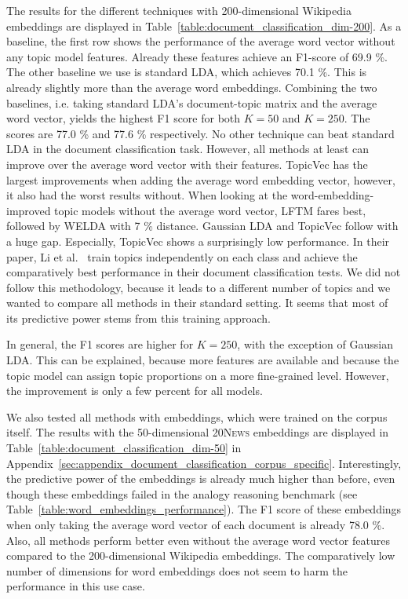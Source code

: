 \documentclass[
        a4paper,
        titlepage,
        twoside,
        parskip,
        numbers=noenddot
        ]{scrbook}
\theoremstyle{break}
\begin{document}
The results for the different techniques with 200-dimensional Wikipedia embeddings are displayed in Table~\ref{table:document_classification_dim-200}.
As a baseline, the first row shows the performance of the average word vector without any topic model features.
Already these features achieve an F1-score of 69.9 \%.
The other baseline we use is standard LDA, which achieves 70.1 \%.
This is already slightly more than the average word embeddings.
Combining the two baselines, i.e. taking standard LDA's document-topic matrix and the average word vector, yields the highest F1 score for both $K = 50$ and $K = 250$.
The scores are 77.0 \% and 77.6 \% respectively.
No other technique can beat standard LDA in the document classification task.
However, all methods at least can improve over the average word vector with their features.
TopicVec has the largest improvements when adding the average word embedding vector, however, it also had the worst results without.
When looking at the word-embedding-improved topic models without the average word vector, LFTM fares best, followed by WELDA with 7 \% distance.
Gaussian LDA and TopicVec follow with a huge gap.
Especially, TopicVec shows a surprisingly low performance.
In their paper,  Li et al.~\cite{Li2016} train topics independently on each class and achieve the comparatively best performance in their document classification tests.
We did not follow this methodology, because it leads to a different number of topics and we wanted to compare all methods in their standard setting.
It seems that most of its predictive power stems from this training approach.

In general, the F1 scores are higher for $K = 250$, with the exception of Gaussian LDA.
This can be explained, because more features are available and because the topic model can assign topic proportions on a more fine-grained level.
However, the improvement is only a few percent for all models.

We also tested all methods with embeddings, which were trained on the corpus itself.
The results with the 50-dimensional \textsc{20News} embeddings are displayed in Table~\ref{table:document_classification_dim-50} in Appendix~\ref{sec:appendix_document_classification_corpus_specific}.
Interestingly, the predictive power of the embeddings is already much higher than before, even though these embeddings failed in the analogy reasoning benchmark (see Table~\ref{table:word_embeddings_performance}).
The F1 score of these embeddings when only taking the average word vector of each document is already 78.0 \%.
Also, all methods perform better even without the average word vector features compared to the 200-dimensional Wikipedia embeddings.
The comparatively low number of dimensions for word embeddings does not seem to harm the performance in this use case.
\end{document}
